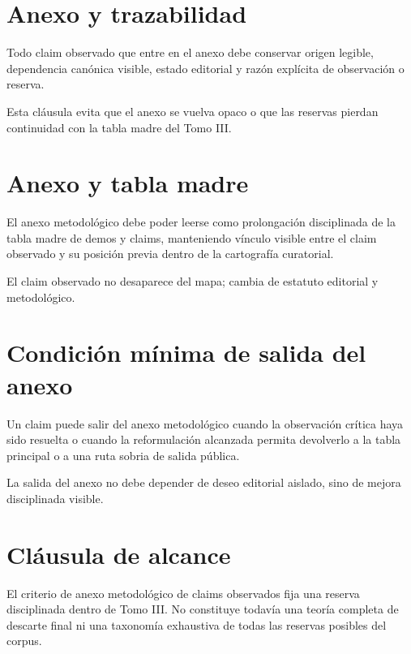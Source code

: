 \section{Anexo y trazabilidad}
\begin{definition}
Todo claim observado que entre en el anexo debe conservar origen legible, dependencia canónica visible, estado editorial y razón explícita de observación o reserva.
\end{definition}

\begin{observation}
Esta cláusula evita que el anexo se vuelva opaco o que las reservas pierdan continuidad con la tabla madre del Tomo III.
\end{observation}

\section{Anexo y tabla madre}
\begin{definition}
El anexo metodológico debe poder leerse como prolongación disciplinada de la tabla madre de demos y claims, manteniendo vínculo visible entre el claim observado y su posición previa dentro de la cartografía curatorial.
\end{definition}

\begin{observation}
El claim observado no desaparece del mapa; cambia de estatuto editorial y metodológico.
\end{observation}

\section{Condición mínima de salida del anexo}
\begin{definition}
Un claim puede salir del anexo metodológico cuando la observación crítica haya sido resuelta o cuando la reformulación alcanzada permita devolverlo a la tabla principal o a una ruta sobria de salida pública.
\end{definition}

\begin{observation}
La salida del anexo no debe depender de deseo editorial aislado, sino de mejora disciplinada visible.
\end{observation}

\section{Cláusula de alcance}
\begin{observation}
El criterio de anexo metodológico de claims observados fija una reserva disciplinada dentro de Tomo III. No constituye todavía una teoría completa de descarte final ni una taxonomía exhaustiva de todas las reservas posibles del corpus.
\end{observation}

